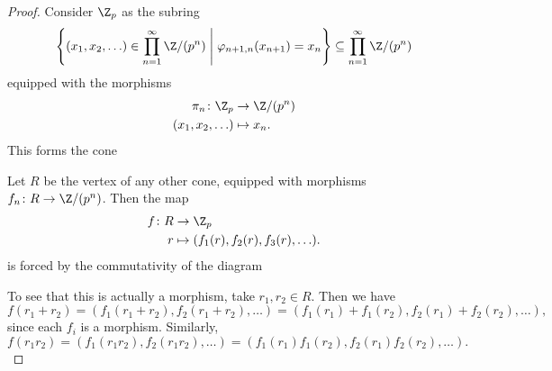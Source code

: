 \documentclass[10pt]{amsart}
\begin{document}
\begin{thm}
\begin{proof}
    Consider $\Z_p$ as the subring
    $$\left\{(x_1, x_2, \ldots) \in \prod_{n=1}^\infty \Z/(p^n) \;\middle\vert\; \varphi_{n+1,n}(x_{n+1}) = x_n \right\} \subseteq \prod_{n=1}^\infty \Z/(p^n)$$
    equipped with the morphisms 
    \begin{align*}
      \pi_n \colon \Z_p &\rightarrow \Z/(p^n)\\
      (x_1, x_2, \ldots) & \mapsto x_n.
    \end{align*}
    This forms the cone
    \begin{center}
    \end{center}
    Let $R$ be the vertex of any other cone, equipped with morphisms $f_n \colon R \rightarrow \Z/(p^n)$.
    Then the map 
    \begin{align*}
      f \colon R &\rightarrow \Z_p\\
      r &\mapsto (f_1(r), f_2(r), f_3(r), \ldots).
    \end{align*}
    is forced by the commutativity of the diagram
    \begin{center}
    \end{center}    
    To see that this is actually a morphism, take $r_1, r_2 \in R$.
    Then we have 
    $$f(r_1 + r_2) = (f_1(r_1 + r_2), f_2(r_1 + r_2), \ldots) = (f_1(r_1) + f_1(r_2), f_2(r_1) + f_2(r_2), \ldots),$$
    since each $f_i$ is a morphism.
    Similarly, 
    $$f(r_1 r_2) = (f_1(r_1 r_2), f_2(r_1 r_2), \ldots) = (f_1(r_1) f_1(r_2), f_2(r_1) f_2(r_2), \ldots).$$
  \end{proof}
\end{thm}
\end{document}
